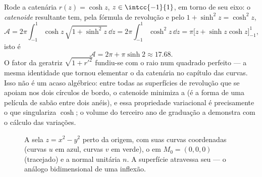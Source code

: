 \begin{example}[O catenoide]\label{ex:b2:surfaces:catenoid}
Rode a catenária $r(z) = \cosh z$, $z \in \intcc{-1}{1}$,
em torno de seu eixo: o \emph{catenoide} resultante tem, pela
fórmula de revolução e pelo $1 + \sinh^2 z = \cosh^2 z$,
\[
\mathcal A = 2\pi\int_{-1}^1\cosh z\,\sqrt{1 + \sinh^2z}\,
\dd z = 2\pi\int_{-1}^1\cosh^2z\,\dd z
= \pi\bigl[z + \sinh z\cosh z\bigr]_{-1}^{1},
\]
isto é
\[
\mathcal A = 2\pi + \pi\sinh 2 \approx 17.68 .
\]
O fator da geratriz $\sqrt{1 + r'^2}$ fundiu-se com o raio
num quadrado perfeito --- a mesma identidade que tornou elementar o
 da catenária no capítulo das curvas. Isso
não é um acaso algébrico: entre todas as superfícies de revolução
que se apoiam nos dois círculos de bordo, o catenoide minimiza a
 (é a forma de uma película de sabão entre dois anéis), e
essa propriedade variacional é precisamente o que singulariza
$\cosh$; o volume do terceiro ano de graduação a demonstra com o cálculo das
variações.
\end{example}

\begin{figure}[ht]
\centering
{}
\caption{A sela $z = x^2 - y^2$ perto da origem, com suas
curvas coordenadas (curvas $u$ em azul, curvas $v$ em verde), o
 em $M_0 = (0,0,0)$ (tracejado) e a normal unitária $n$.
A superfície atravessa seu  --- o análogo
bidimensional de uma inflexão.}
\label{fig:b2:surfaces:saddle}
\end{figure}

